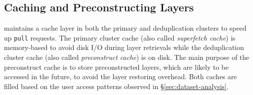 \subsection{Caching and Preconstructing Layers}
\label{sec:cache-design}


%


\sysname maintains a cache layer in both the primary and deduplication clusters to speed up
\texttt{pull} requests. The primary cluster cache (also called \emph{superfetch cache}) is
memory-based to avoid disk I/O during layer retrievals while the deduplication cluster cache
(also called \emph{preconstruct cache}) is on disk. The main purpose of the preconstruct
cache is to store preconstructed layers, which are likely to be accessed in the future,
to avoid the layer restoring overhead.
%
Both caches are filled based on the user access patterns observed in \S\ref{sec:dataset-analysis}.
%

